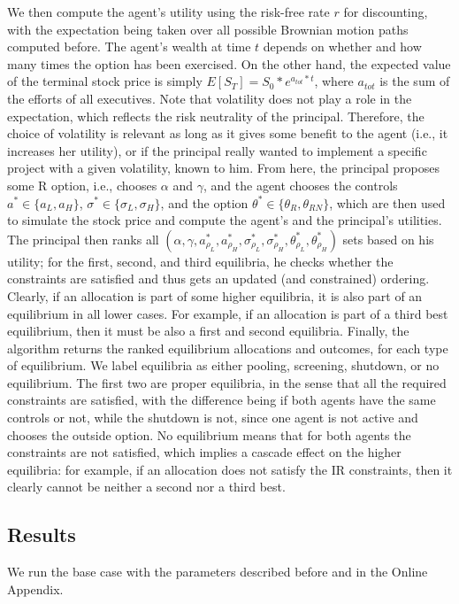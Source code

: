 We then compute the agent's utility using the risk-free rate $r$ for discounting, with the expectation being taken over all possible Brownian motion paths computed before. The agent's wealth at time $t$ depends on whether and how many times the option has been exercised. On the other hand, the expected value of the terminal stock price is simply $E[S_T] = S_0 * e^{a_{tot}*t}$, where $a_{tot}$ is the sum of the efforts of all executives. Note that volatility does not play a role in the expectation, which reflects the risk neutrality of the principal. Therefore, the choice of volatility is relevant as long as it gives some benefit to the agent (i.e., it increases her utility), or if the principal really wanted to implement a specific project with a given volatility, known to him.
From here, the principal proposes some R option, i.e., chooses $\alpha$ and $\gamma$, and the agent chooses the controls $a^* \in \{a_L, a_H\}$, $\sigma^* \in \{\sigma_L, \sigma_H\}$, and the option $\theta^* \in \{ \theta_R, \theta_{RN} \}$, which are then used to simulate the stock price and compute the agent's and the principal's utilities. The principal then ranks all $(\alpha, \gamma, a^*_{\rho_L}, a^*_{\rho_H}, \sigma^*_{\rho_L}, \sigma^*_{\rho_H}, \theta^*_{\rho_L}, \theta^*_{\rho_H})$ sets based on his utility; for the first, second, and third equilibria, he checks whether the constraints are satisfied and thus gets an updated (and constrained) ordering. Clearly, if an allocation is part of some higher equilibria, it is also part of an equilibrium in all lower cases. For example, if an allocation is part of a third best equilibrium, then it must be also a first and second equilibria. Finally, the algorithm returns the ranked equilibrium allocations and outcomes, for each type of equilibrium. We label equilibria as either pooling, screening, shutdown, or no equilibrium. The first two are proper equilibria, in the sense that all the required constraints are satisfied, with the difference being if both agents have the same controls or not, while the shutdown is not, since one agent is not active and chooses the outside option. No equilibrium means that for both agents the constraints are not satisfied, which implies a cascade effect on the higher equilibria: for example, if an allocation does not satisfy the IR constraints, then it clearly cannot be neither a second nor a third best.


\subsection{Results} 
We run the base case with the parameters described before and in the Online Appendix.


